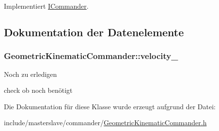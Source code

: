 Implementiert \hyperlink{classICommander_abcacd07f49f646d08e1722a1df08b8ce}{I\-Commander}.



\subsection{Dokumentation der Datenelemente}
\hypertarget{classGeometricKinematicCommander_afbfee50f578ff4098026413f41b916a3}{
\subsubsection[{velocity\-\_\-}]{\setlength{\rightskip}{0pt plus 5cm}Geometric\-Kinematic\-Commander\-::velocity\-\_\-\hspace{0.3cm}{\ttfamily [private]}}}\label{classGeometricKinematicCommander_afbfee50f578ff4098026413f41b916a3}
\begin{DoxyRefDesc}{Noch zu erledigen}
\item[\hyperlink{todo__todo000001}{Noch zu erledigen}]check ob noch benötigt \end{DoxyRefDesc}


Die Dokumentation für diese Klasse wurde erzeugt aufgrund der Datei\-:\begin{DoxyCompactItemize}
\item 
include/masterslave/commander/\hyperlink{GeometricKinematicCommander_8h}{Geometric\-Kinematic\-Commander.\-h}\end{DoxyCompactItemize}
